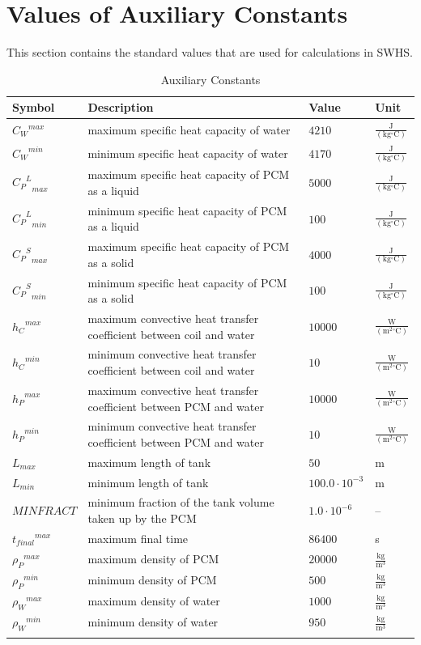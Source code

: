 \documentclass[12pt]{article}
\begin{document}
\section{Values of Auxiliary Constants}
\label{Sec:AuxConstants}
This section contains the standard values that are used for calculations in SWHS.
\begin{longtabu}{l X[l] l l}
\toprule
Symbol & Description & Value & Unit
\\
\midrule
${{C_{W}}^{max}}$ & maximum specific heat capacity of water & $4210$ & $\frac{\text{J}}{(\text{kg}{}^{\circ}\text{C})}$
\\
${{C_{W}}^{min}}$ & minimum specific heat capacity of water & $4170$ & $\frac{\text{J}}{(\text{kg}{}^{\circ}\text{C})}$
\\
${{{C_{P}}^{L}}_{max}}$ & maximum specific heat capacity of PCM as a liquid & $5000$ & $\frac{\text{J}}{(\text{kg}{}^{\circ}\text{C})}$
\\
${{{C_{P}}^{L}}_{min}}$ & minimum specific heat capacity of PCM as a liquid & $100$ & $\frac{\text{J}}{(\text{kg}{}^{\circ}\text{C})}$
\\
${{{C_{P}}^{S}}_{max}}$ & maximum specific heat capacity of PCM as a solid & $4000$ & $\frac{\text{J}}{(\text{kg}{}^{\circ}\text{C})}$
\\
${{{C_{P}}^{S}}_{min}}$ & minimum specific heat capacity of PCM as a solid & $100$ & $\frac{\text{J}}{(\text{kg}{}^{\circ}\text{C})}$
\\
${{h_{C}}^{max}}$ & maximum convective heat transfer coefficient between coil and water & $10000$ & $\frac{\text{W}}{(\text{m}^{2}{}^{\circ}\text{C})}$
\\
${{h_{C}}^{min}}$ & minimum convective heat transfer coefficient between coil and water & $10$ & $\frac{\text{W}}{(\text{m}^{2}{}^{\circ}\text{C})}$
\\
${{h_{P}}^{max}}$ & maximum convective heat transfer coefficient between PCM and water & $10000$ & $\frac{\text{W}}{(\text{m}^{2}{}^{\circ}\text{C})}$
\\
${{h_{P}}^{min}}$ & minimum convective heat transfer coefficient between PCM and water & $10$ & $\frac{\text{W}}{(\text{m}^{2}{}^{\circ}\text{C})}$
\\
${L_{max}}$ & maximum length of tank & $50$ & m
\\
${L_{min}}$ & minimum length of tank & $100.0\cdot{}10^{-3}$ & m
\\
$MINFRACT$ & minimum fraction of the tank volume taken up by the PCM & $1.0\cdot{}10^{-6}$ & --
\\
${{t_{final}}^{max}}$ & maximum final time & $86400$ & s
\\
${{ρ_{P}}^{max}}$ & maximum density of PCM & $20000$ & $\frac{\text{kg}}{\text{m}^{3}}$
\\
${{ρ_{P}}^{min}}$ & minimum density of PCM & $500$ & $\frac{\text{kg}}{\text{m}^{3}}$
\\
${{ρ_{W}}^{max}}$ & maximum density of water & $1000$ & $\frac{\text{kg}}{\text{m}^{3}}$
\\
${{ρ_{W}}^{min}}$ & minimum density of water & $950$ & $\frac{\text{kg}}{\text{m}^{3}}$
\\
\bottomrule
\caption{Auxiliary Constants}
\label{Table:TAuxConsts}
\end{longtabu}
\end{document}
